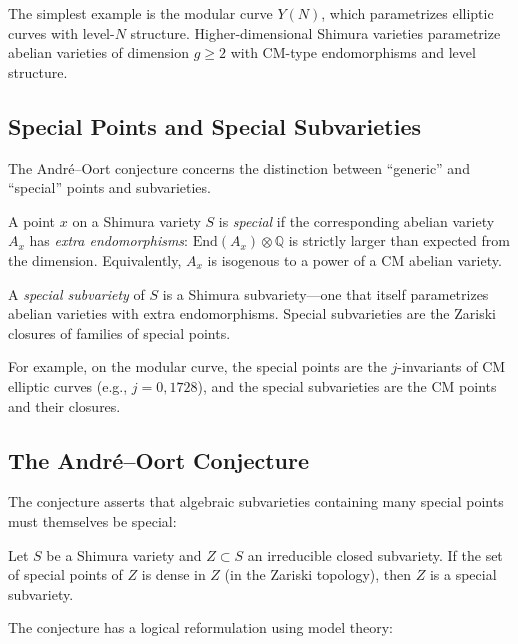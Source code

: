 The simplest example is the modular curve $Y(N)$, which parametrizes elliptic curves with level-$N$ structure. Higher-dimensional Shimura varieties parametrize abelian varieties of dimension $g \ge 2$ with CM-type endomorphisms and level structure.

\subsection{Special Points and Special Subvarieties}

The André--Oort conjecture concerns the distinction between ``generic'' and ``special'' points and subvarieties.

\begin{definition}
A point $x$ on a Shimura variety $S$ is \emph{special} if the corresponding abelian variety $A_x$ has \emph{extra endomorphisms}: $\text{End}(A_x) \otimes \mathbb{Q}$ is strictly larger than expected from the dimension. Equivalently, $A_x$ is isogenous to a power of a CM abelian variety.
\end{definition}

\begin{definition}
A \emph{special subvariety} of $S$ is a Shimura subvariety---one that itself parametrizes abelian varieties with extra endomorphisms. Special subvarieties are the Zariski closures of families of special points.
\end{definition}

For example, on the modular curve, the special points are the $j$-invariants of CM elliptic curves (e.g., $j = 0, 1728$), and the special subvarieties are the CM points and their closures.

\subsection{The André--Oort Conjecture}

The conjecture asserts that algebraic subvarieties containing many special points must themselves be special:

\begin{conjecture}
Let $S$ be a Shimura variety and $Z \subset S$ an irreducible closed subvariety. If the set of special points of $Z$ is dense in $Z$ (in the Zariski topology), then $Z$ is a special subvariety.
\end{conjecture}

The conjecture has a logical reformulation using model theory:

